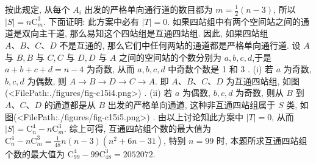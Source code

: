 按此规定, 从每个 $A_i$ 出发的严格单向通行道的数目都为 $m=\frac{1}{2}(n-3)$, 所以 $|S|=n \mathrm{C}_m^3$. 下面证明: 此方案中必有 $|T|=0$.
如果四站组中有两个空间站之间的通道是双向主干道, 那么易知这个四站组是互通四站组.
因此, 如果四站组 $A 、 B 、 C 、 D$ 不是互通的, 那么它们中任何两站的通道都是严格单向通行道.
设 $A$ 与 $B, B$ 与 $C, C$ 与 $D, D$ 与 $A$ 之间的空间站的个数分别为 $a, b, c, d$,于是 $a+b+c+d=n-4$ 为奇数, 从而 $a, b, c, d$ 中奇数个数是 1 和 3 .
(i) 若 $a$ 为奇数, $b, c, d$ 为偶数, 则 $A \rightarrow B \rightarrow D \rightarrow C \rightarrow A$. 即 $A 、 B 、 C 、 D$ 为互通四站组, 如图(<FilePath:./figures/fig-c15i4.png>) .
(ii) 若 $a$ 为偶数, $b, c, d$ 为奇数, 则从 $B$ 到 $A 、 C 、 D$ 的通道都是从 $B$ 出发的严格单向通道, 这种非互通四站组属于 $S$ 类, 如图(<FilePath:./figures/fig-c15i5.png>) .
由以上讨论知此方案中 $|T|=0$, 从而 $|S|=\mathrm{C}_n^4-n \mathrm{C}_m^3$.
综上可得, 互通四站组个数的最大值为 $\mathrm{C}_n^4-n \mathrm{C}_m^3=\frac{1}{48} n(n-3)\left(n^2+6 n-31\right)$, 特别 $n=99$ 时, 本题所求互通四站组个数的最大值为 $\mathrm{C}_{99}^4-99 \mathrm{C}_{48}^3=2052072$.



